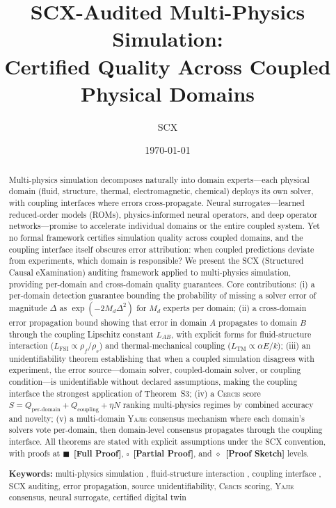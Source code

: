 \documentclass[11pt,a4paper]{article}
\title{SCX-Audited Multi-Physics Simulation:\\Certified Quality Across Coupled Physical Domains}
\author{SCX}
\date{\today}
\theoremstyle{definition}
\newcommand{\rigorFull}[0]{$\blacksquare$~\textbf{[Full Proof]}}
\newcommand{\rigorPartial}[0]{$\square$~\textbf{[Partial Proof]}}
\newcommand{\rigorSketch}[0]{$\diamond$~\textbf{[Proof Sketch]}}
\newcommand{\Yajie}{\textsc{Yajie}}
\newcommand{\Cercis}{\textsc{Cercis}}
\newcommand{\SCX}{\textsc{SCX}}
\newcommand{\ThmSCXHonest}{Theorem~S3}
\begin{document}
\maketitle

\begin{abstract}
Multi-physics simulation decomposes naturally into domain experts---each physical domain (fluid, structure, thermal, electromagnetic, chemical) deploys its own solver, with coupling interfaces where errors cross-propagate. Neural surrogates---learned reduced-order models (ROMs), physics-informed neural operators, and deep operator networks---promise to accelerate individual domains or the entire coupled system. Yet no formal framework certifies simulation quality across coupled domains, and the coupling interface itself obscures error attribution: when coupled predictions deviate from experiments, which domain is responsible? We present the \SCX{} (Structured Causal eXamination) auditing framework applied to multi-physics simulation, providing per-domain and cross-domain quality guarantees. Core contributions: (i) a per-domain detection guarantee bounding the probability of missing a solver error of magnitude $\Delta$ as $\exp(-2M_d \Delta^2)$ for $M_d$ experts per domain; (ii) a cross-domain error propagation bound showing that error in domain $A$ propagates to domain $B$ through the coupling Lipschitz constant $L_{AB}$, with explicit forms for fluid-structure interaction ($L_{\mathrm{FSI}} \propto \rho_f / \rho_s$) and thermal-mechanical coupling ($L_{\mathrm{TM}} \propto \alpha E / k$); (iii) an unidentifiability theorem establishing that when a coupled simulation disagrees with experiment, the error source---domain solver, coupled-domain solver, or coupling condition---is unidentifiable without declared assumptions, making the coupling interface the strongest application of \ThmSCXHonest; (iv) a \Cercis{} score $S = Q_{\mathrm{per\text{-}domain}} + Q_{\mathrm{coupling}} + \eta N$ ranking multi-physics regimes by combined accuracy and novelty; (v) a multi-domain \Yajie{} consensus mechanism where each domain's solvers vote per-domain, then domain-level consensus propagates through the coupling interface. All theorems are stated with explicit assumptions under the \SCX{} convention, with proofs at \rigorFull, \rigorPartial, and \rigorSketch{} levels.

\medskip
\noindent\textbf{Keywords:} multi-physics simulation , fluid-structure interaction , coupling interface , SCX auditing, error propagation, source unidentifiability, \Cercis{} scoring, \Yajie{} consensus, neural surrogate, certified digital twin
\end{abstract}
\end{document}
